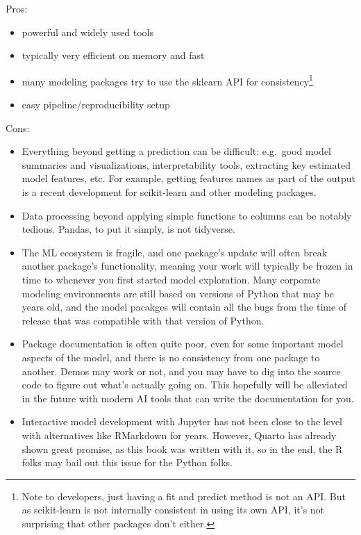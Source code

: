 \documentclass[
  letterpaper,
]{krantz}
\providecommand{\tightlist}{%
  \setlength{\itemsep}{0pt}\setlength{\parskip}{0pt}}\usepackage{longtable,booktabs,array}
\begin{document}
Pros:

\begin{itemize}
\tightlist
\item
  powerful and widely used tools
\item
  typically very efficient on memory and fast
\item
  many modeling packages try to use the sklearn API for
  consistency\footnote{Note to developers, just having a fit and predict
    method is not an API. But as scikit-learn is not internally
    consistent in using its own API, it's not surprising that other
    packages don't either.}
\item
  easy pipeline/reproducibility setup
\end{itemize}

Cons:

\begin{itemize}
\tightlist
\item
  Everything beyond getting a prediction can be difficult: e.g.~good
  model summaries and visualizations, interpretability tools, extracting
  key estimated model features, etc. For example, getting features names
  as part of the output is a recent development for scikit-learn and
  other modeling packages.
\item
  Data processing beyond applying simple functions to columns can be
  notably tedious. Pandas, to put it simply, is not tidyverse.
\item
  The ML ecosystem is fragile, and one package's update will often break
  another package's functionality, meaning your work will typically be
  frozen in time to whenever you first started model exploration. Many
  corporate modeling environments are still based on versions of Python
  that may be years old, and the model pacakges will contain all the
  bugs from the time of release that was compatible with that version of
  Python.
\item
  Package documentation is often quite poor, even for some important
  model aspects of the model, and there is no consistency from one
  package to another. Demos may work or not, and you may have to dig
  into the source code to figure out what's actually going on. This
  hopefully will be alleviated in the future with modern AI tools that
  can write the documentation for you.
\item
  Interactive model development with Jupyter has not been close to the
  level with alternatives like RMarkdown for years. However, Quarto has
  already shown great promise, as this book was written with it, so in
  the end, the R folks may bail out this issue for the Python folks.
\end{itemize}
\end{document}
